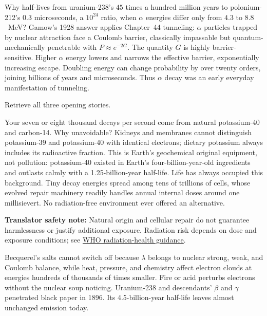\begin{challenge}
Why half-lives from uranium-238's \(45\) times a hundred million years to polonium-212's \(0.3\) microseconds, a \(10^{24}\) ratio, when \(\alpha\) energies differ only from \(4.3\) to \(8.8\)~MeV? Gamow's 1928 answer applies Chapter~44 tunneling: \(\alpha\) particles trapped by nuclear attraction face a Coulomb barrier, classically impassable but quantum-mechanically penetrable with \(P\approx e^{-2G}\). The quantity \(G\) is highly barrier-sensitive. Higher \(\alpha\) energy lowers and narrows the effective barrier, exponentially increasing escape. Doubling energy can change probability by over twenty orders, joining billions of years and microseconds. Thus \(\alpha\) decay was an early everyday manifestation of tunneling.
\end{challenge}


Retrieve all three opening stories.

Your seven or eight thousand decays per second come from natural potassium-40 and carbon-14. Why unavoidable? Kidneys and membranes cannot distinguish potassium-39 and potassium-40 with identical electrons; dietary potassium always includes its radioactive fraction. This is Earth's geochemical original equipment, not pollution: potassium-40 existed in Earth's four-billion-year-old ingredients and outlasts calmly with a 1.25-billion-year half-life. Life has always occupied this background. Tiny decay energies spread among tens of trillions of cells, whose evolved repair machinery readily handles annual internal doses around one millisievert. No radiation-free environment ever offered an alternative.

\textbf{Translator safety note:} Natural origin and cellular repair do not guarantee harmlessness or justify additional exposure. Radiation risk depends on dose and exposure conditions; see \href{https://www.who.int/news-room/fact-sheets/detail/ionizing-radiation-and-health-effects}{WHO radiation-health guidance}.

Becquerel's salts cannot switch off because \(\lambda\) belongs to nuclear strong, weak, and Coulomb balance, while heat, pressure, and chemistry affect electron clouds at energies hundreds of thousands of times smaller. Fire or acid perturbs electrons without the nuclear soup noticing. Uranium-238 and descendants' \(\beta\) and \(\gamma\) penetrated black paper in 1896. Its 4.5-billion-year half-life leaves almost unchanged emission today.


